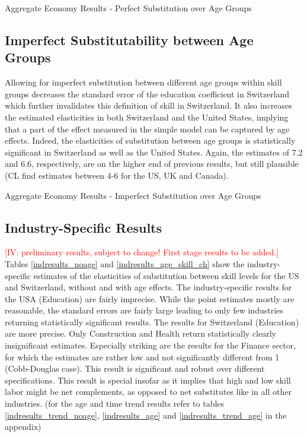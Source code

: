 \documentclass[]{article}
\begin{document}
\begin{table}[H]
  \centering
  \caption{Aggregate Economy Results - Perfect Substitution over Age
    Groups}
  
  \label{noage_main}
\end{table}%

\subsection{Imperfect Substitutability between Age Groups}
Allowing for imperfect substitution between different age groups
within skill groups decreases the standard error of the education
coefficient in Switzerland which further invalidates this definition
of skill in Switzerland. It also increases the estimated elasticities
in both Switzerland and the United States, implying that a part of the
effect measured in the simple model can be captured by age
effects. Indeed, the elasticities of substitution between age groups
is statistically significant in Switzerland as well as the United
States. Again, the estimates of 7.2 and 6.6, respectively, are on the
higher end of previous results, but still plausible (CL find estimates
between 4-6 for the US, UK and Canada).

\begin{table}[H]
  \centering
  \caption{Aggregate Economy Results - Imperfect Substitution over Age
    Groups}
  
  \label{age_main}
\end{table}%

\subsection{Industry-Specific Results}
\textcolor{red}{[IV: preliminary results, subject to change! First
  stage results to be added.]}  Tables \ref{indresults_noage} and
\ref{indresults_age_skill_ch} show the industry-specific estimates of the
elasticities of substitution between skill levels for the US and
Switzerland, without and with age effects. The industry-specific
results for the USA (Education) are fairly imprecise. While the point
estimates mostly are reasonable, the standard errors are fairly large
leading to only few industries returning statistically significant
results. The results for Switzerland (Education) are more
precise. Only Construction and Health return statistically clearly
insignificant estimates. Especially striking are the results for the
Finance sector, for which the estimates are rather low and not
significantly different from 1 (Cobb-Douglas case). This result is
significant and robust over different specifications. This result is
special insofar as it implies that high and low skill labor might be
net complements, as opposed to net substitutes like in all other
industries. (for the age and time trend results refer to tables
\ref{indresults_trend_noage}, \ref{indresults_age} and
\ref{indresults_trend_age} in the appendix)
\end{document}
